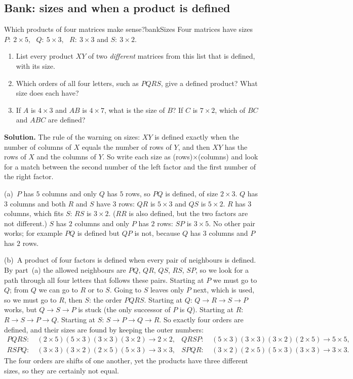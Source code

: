 \documentclass[11pt]{article}
\begin{document}
\subsection*{Bank: sizes and when a product is defined}

\begin{exmp}{Which products of four matrices make sense?}{bankSizes}
Four matrices have sizes $P:\ 2\times5$, \ $Q:\ 5\times3$, \ $R:\ 3\times3$ and $S:\ 3\times2$.
\begin{enumerate}[label=(\alph*),itemsep=2pt]
  \item List every product $XY$ of two \emph{different} matrices from this list that is defined, with its size.
  \item Which orders of all four letters, such as $PQRS$, give a defined product? What size does each have?
  \item If $A$ is $4\times3$ and $AB$ is $4\times7$, what is the size of $B$? If $C$ is $7\times2$, which of $BC$ and $ABC$ are defined?
\end{enumerate}

\textbf{Solution.} The rule of the warning on sizes: $XY$ is defined exactly when the number of columns of $X$ equals the number of rows of $Y$, and then $XY$ has the rows of $X$ and the columns of $Y$. So write each size as (rows)$\times$(columns) and look for a match between the second number of the left factor and the first number of the right factor.

(a)~$P$ has $5$ columns and only $Q$ has $5$ rows, so $PQ$ is defined, of size $2\times3$. $Q$ has $3$ columns and both $R$ and $S$ have $3$ rows: $QR$ is $5\times3$ and $QS$ is $5\times2$. $R$ has $3$ columns, which fits $S$: $RS$ is $3\times2$. ($RR$ is also defined, but the two factors are not different.) $S$ has $2$ columns and only $P$ has $2$ rows: $SP$ is $3\times5$. No other pair works; for example $PQ$ is defined but $QP$ is not, because $Q$ has $3$ columns and $P$ has $2$ rows.

(b)~A product of four factors is defined when every pair of neighbours is defined. By part~(a) the allowed neighbours are $PQ$, $QR$, $QS$, $RS$, $SP$, so we look for a path through all four letters that follows these pairs. Starting at $P$ we must go to $Q$; from $Q$ we can go to $R$ or to $S$. Going to $S$ leaves only $P$ next, which is used, so we must go to $R$, then $S$: the order $PQRS$. Starting at $Q$: $Q\to R\to S\to P$ works, but $Q\to S\to P$ is stuck (the only successor of $P$ is $Q$). Starting at $R$: $R\to S\to P\to Q$. Starting at $S$: $S\to P\to Q\to R$. So exactly four orders are defined, and their sizes are found by keeping the outer numbers:
\begin{align*}
PQRS:&\ (2\times5)(5\times3)(3\times3)(3\times2)\to 2\times2, & QRSP:&\ (5\times3)(3\times3)(3\times2)(2\times5)\to 5\times5,\\
RSPQ:&\ (3\times3)(3\times2)(2\times5)(5\times3)\to 3\times3, & SPQR:&\ (3\times2)(2\times5)(5\times3)(3\times3)\to 3\times3.
\end{align*}
The four orders are shifts of one another, yet the products have three different sizes, so they are certainly not equal.


\end{exmp}
\end{document}
